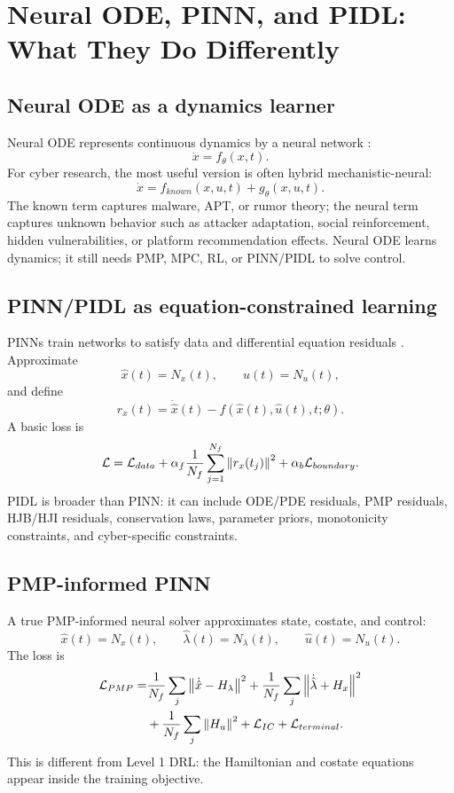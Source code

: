 \documentclass[11pt,a4paper]{article}
\begin{document}
\section{Neural ODE, PINN, and PIDL: What They Do Differently}
\subsection{Neural ODE as a dynamics learner}
Neural ODE represents continuous dynamics by a neural network \cite{chen2018neuralode}:
\begin{equation}
\dot{x}=f_\theta(x,t).
\end{equation}
For cyber research, the most useful version is often hybrid mechanistic-neural:
\begin{equation}
\dot{x}=f_{known}(x,u,t)+g_\theta(x,u,t).
\end{equation}
The known term captures malware, APT, or rumor theory; the neural term captures unknown behavior such as attacker adaptation, social reinforcement, hidden vulnerabilities, or platform recommendation effects. Neural ODE learns dynamics; it still needs PMP, MPC, RL, or PINN/PIDL to solve control.

\subsection{PINN/PIDL as equation-constrained learning}
PINNs train networks to satisfy data and differential equation residuals \cite{raissi2019}. Approximate
\begin{equation}
\hat{x}(t)=N_x(t),\qquad \hat{u}(t)=N_u(t),
\end{equation}
and define
\begin{equation}
r_x(t)=\dot{\hat{x}}(t)-f(\hat{x}(t),\hat{u}(t),t;\theta).
\end{equation}
A basic loss is
\begin{equation}
\mathcal{L}=\mathcal{L}_{data}+\alpha_f\frac{1}{N_f}\sum_{j=1}^{N_f}\left\lVert r_x(t_j) \right\rVert^2+\alpha_b\mathcal{L}_{boundary}.
\end{equation}
PIDL is broader than PINN: it can include ODE/PDE residuals, PMP residuals, HJB/HJI residuals, conservation laws, parameter priors, monotonicity constraints, and cyber-specific constraints.

\subsection{PMP-informed PINN}
A true PMP-informed neural solver approximates state, costate, and control:
\begin{equation}
\hat{x}(t)=N_x(t),\qquad \hat{\lambda}(t)=N_\lambda(t),\qquad \hat{u}(t)=N_u(t).
\end{equation}
The loss is
\begin{align}
\mathcal{L}_{PMP}=&\frac{1}{N_f}\sum_j\left\lVert \dot{\hat{x}}-H_\lambda \right\rVert^2
+\frac{1}{N_f}\sum_j\left\lVert \dot{\hat{\lambda}}+H_x \right\rVert^2 \\
&+\frac{1}{N_f}\sum_j\left\lVert H_u \right\rVert^2+\mathcal{L}_{IC}+\mathcal{L}_{terminal}.
\end{align}
This is different from Level 1 DRL: the Hamiltonian and costate equations appear inside the training objective.
\end{document}
